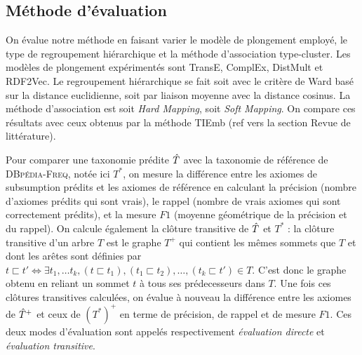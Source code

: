 \subsection{Méthode d'évaluation}
\label{subsec:te-evaluation}

On évalue notre méthode en faisant varier le modèle de plongement employé, le type de regroupement hiérarchique et la méthode d'association type-cluster. Les modèles de plongement expérimentés sont TransE, ComplEx, DistMult et RDF2Vec. Le regroupement hiérarchique se fait soit avec le critère de Ward basé sur la distance euclidienne, soit par liaison moyenne avec la distance cosinus. La méthode d'association est soit \textit{Hard Mapping}, soit \textit{Soft Mapping}. On compare ces résultats avec ceux obtenus par la méthode TIEmb (ref vers la section Revue de littérature). 

Pour comparer une taxonomie prédite $\hat{T}$ avec la taxonomie de référence de \textsc{DBpédia-Freq}, notée ici $T^*$, on mesure la différence entre les axiomes de subsumption prédits et les axiomes de référence en calculant la précision (nombre d'axiomes prédits qui sont vrais), le rappel (nombre de vrais axiomes qui sont correctement prédits), et la mesure $F1$ (moyenne géométrique de la précision et du rappel). On calcule également la clôture transitive de $\hat{T}$ et $T^*$ : la clôture transitive d'un arbre $T$ est le graphe $T^+$ qui contient les mêmes sommets que $T$ et dont les arêtes sont définies par $t \sqsubset t' \iff \exists t_1, \ldots t_k, (t \sqsubset t_1), (t_1 \sqsubset t_2), \ldots, (t_k \sqsubset t') \in T$. C'est donc le graphe obtenu en reliant un sommet $t$ à tous ses prédecesseurs dans $T$. Une fois ces clôtures transitives calculées, on évalue à nouveau la différence entre les axiomes de $\hat{T}^+$ et ceux de $(T^*)^+$ en terme de précision, de rappel et de mesure $F1$. Ces deux modes d'évaluation sont appelés respectivement \textit{évaluation directe} et \textit{évaluation transitive}.


